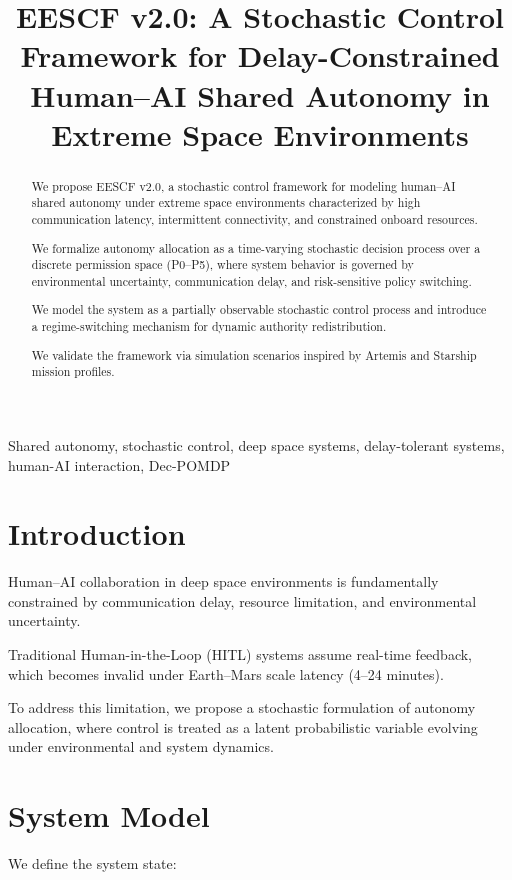 \documentclass[conference]{IEEEtran}
\title{EESCF v2.0: A Stochastic Control Framework for Delay-Constrained Human--AI Shared Autonomy in Extreme Space Environments}
\author{
\IEEEauthorblockN{Anonymous Author}
\IEEEauthorblockA{
Independent Research \\
EntropyGuard Systems Lab \\
Email: anonymous@research.org
}
}
\begin{document}
\maketitle

\begin{abstract}
We propose EESCF v2.0, a stochastic control framework for modeling human--AI shared autonomy under extreme space environments characterized by high communication latency, intermittent connectivity, and constrained onboard resources.

We formalize autonomy allocation as a time-varying stochastic decision process over a discrete permission space (P0--P5), where system behavior is governed by environmental uncertainty, communication delay, and risk-sensitive policy switching.

We model the system as a partially observable stochastic control process and introduce a regime-switching mechanism for dynamic authority redistribution.

We validate the framework via simulation scenarios inspired by Artemis and Starship mission profiles.
\end{abstract}

\begin{IEEEkeywords}
Shared autonomy, stochastic control, deep space systems, delay-tolerant systems, human-AI interaction, Dec-POMDP
\end{IEEEkeywords}

\section{Introduction}

Human--AI collaboration in deep space environments is fundamentally constrained by communication delay, resource limitation, and environmental uncertainty.

Traditional Human-in-the-Loop (HITL) systems assume real-time feedback, which becomes invalid under Earth--Mars scale latency (4--24 minutes).

To address this limitation, we propose a stochastic formulation of autonomy allocation, where control is treated as a latent probabilistic variable evolving under environmental and system dynamics.

\section{System Model}

We define the system state:
\end{document}
